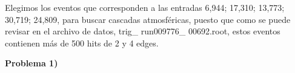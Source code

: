 \documentclass[11pt]{article}
\begin{document}
Elegimos los eventos que corresponden a las entradas 6,944; 17,310;  13,773;  30,719; 24,809, para buscar cascadas atmosféricas, puesto que como se puede revisar en el archivo de datos, trig\_ run009776\_ 00692.root, estos eventos contienen más de 500 hits de 2 y 4 edges. 

\textbf{Problema 1)}

\begin{figure}[H]
\centering
{}



\end{figure}
\end{document}

